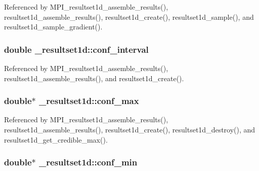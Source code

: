 Referenced by M\+P\+I\+\_\+resultset1d\+\_\+assemble\+\_\+results(), resultset1d\+\_\+assemble\+\_\+results(), resultset1d\+\_\+create(), resultset1d\+\_\+sample(), and resultset1d\+\_\+sample\+\_\+gradient().

\subsubsection[{\texorpdfstring{conf\+\_\+interval}{conf_interval}}]{\setlength{\rightskip}{0pt plus 5cm}double \+\_\+resultset1d\+::conf\+\_\+interval}\hypertarget{struct__resultset1d_af429ddccce37c2e215fd662aae3b63be}{}\label{struct__resultset1d_af429ddccce37c2e215fd662aae3b63be}


Referenced by M\+P\+I\+\_\+resultset1d\+\_\+assemble\+\_\+results(), resultset1d\+\_\+assemble\+\_\+results(), and resultset1d\+\_\+create().

\subsubsection[{\texorpdfstring{conf\+\_\+max}{conf_max}}]{\setlength{\rightskip}{0pt plus 5cm}double$\ast$ \+\_\+resultset1d\+::conf\+\_\+max}\hypertarget{struct__resultset1d_ab66a2650b6cd6f3842e2de31b04a2c38}{}\label{struct__resultset1d_ab66a2650b6cd6f3842e2de31b04a2c38}


Referenced by M\+P\+I\+\_\+resultset1d\+\_\+assemble\+\_\+results(), resultset1d\+\_\+assemble\+\_\+results(), resultset1d\+\_\+create(), resultset1d\+\_\+destroy(), and resultset1d\+\_\+get\+\_\+credible\+\_\+max().

\subsubsection[{\texorpdfstring{conf\+\_\+min}{conf_min}}]{\setlength{\rightskip}{0pt plus 5cm}double$\ast$ \+\_\+resultset1d\+::conf\+\_\+min}\hypertarget{struct__resultset1d_a34a4e724bb47811c9e71316fb90d6e18}{}\label{struct__resultset1d_a34a4e724bb47811c9e71316fb90d6e18}


